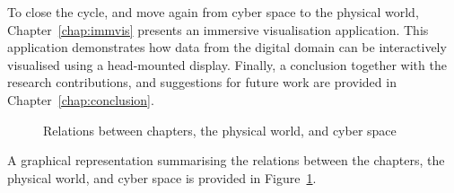 To close the cycle, and move again from cyber space to the physical world, Chapter~\ref{chap:immvis} presents an immersive visualisation application. This application demonstrates how data from the digital domain can be interactively visualised using a head-mounted display. Finally, a conclusion together with the research contributions, and suggestions for future work are provided in Chapter~\ref{chap:conclusion}.

\begin{figure}[h]
\centering
{}%
\caption{Relations between chapters, the physical world, and cyber space}
\label{fig:chaps}
\end{figure}

A graphical representation summarising the relations between the chapters, the physical world, and cyber space is provided in Figure~\ref{fig:chaps}.

\printbibliography[heading=subbibnumbered]